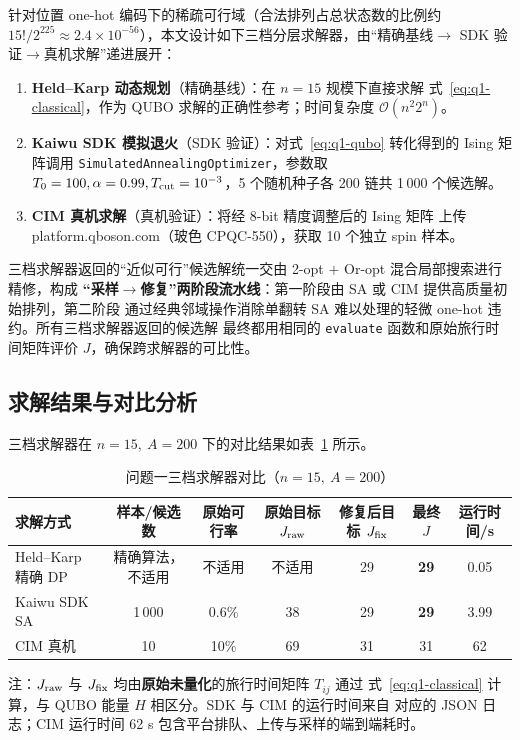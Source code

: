 \documentclass[UTF8,12pt,a4paper]{ctexart}
\begin{document}
针对位置 one-hot 编码下的稀疏可行域（合法排列占总状态数的比例约
$15!/2^{225}\!\approx\!2.4\times 10^{-56}$），本文设计如下三档分层求解器，由``精确基线$\to$
SDK 验证$\to$真机求解''递进展开：
\begin{enumerate}
  \item[(i)] \textbf{Held--Karp 动态规划}\cite{heldkarp1962dp}（精确基线）：在 $n=15$ 规模下直接求解
    式~\eqref{eq:q1-classical}，作为 QUBO 求解的正确性参考；时间复杂度 $\mathcal{O}(n^{2}2^{n})$。
  \item[(ii)] \textbf{Kaiwu SDK 模拟退火}\cite{kirkpatrick1983sa,kaiwusdk2024}（SDK 验证）：对式~\eqref{eq:q1-qubo} 转化得到的
    Ising 矩阵调用 \texttt{SimulatedAnnealingOptimizer}，参数取 $T_{0}=100,\alpha=0.99,
    T_{\rm cut}=10^{-3}$，5 个随机种子各 200 链共 1\,000 个候选解。
  \item[(iii)] \textbf{CIM 真机求解}（真机验证）：将经 8-bit 精度调整后的 Ising 矩阵
    上传 platform.qboson.com（玻色 CPQC-550），获取 10 个独立 spin 样本。
\end{enumerate}
三档求解器返回的``近似可行''候选解统一交由 2-opt\cite{lin1973twoopt} $+$ Or-opt\cite{or1976oropt} 混合局部搜索进行精修，构成
\textbf{``采样$\to$修复''两阶段流水线}：第一阶段由 SA 或 CIM 提供高质量初始排列，第二阶段
通过经典邻域操作消除单翻转 SA 难以处理的轻微 one-hot 违约。所有三档求解器返回的候选解
最终都用相同的 \texttt{evaluate} 函数和原始旅行时间矩阵评价 $J$，确保跨求解器的可比性。

\subsection{求解结果与对比分析}
\label{subsec:q1-result}

三档求解器在 $n=15,\ A=200$ 下的对比结果如表~\ref{tab:q1-cmp} 所示。

\begin{table}[H]
  \centering
  \caption{问题一三档求解器对比（$n=15,\ A=200$）}
  \label{tab:q1-cmp}
  \footnotesize
  \begin{tabular}{lcccccc}
    \toprule
    求解方式 & 样本/候选数 & 原始可行率 & 原始目标 $J_{\rm raw}$ & 修复后目标 $J_{\rm fix}$ & 最终 $J$ & 运行时间/s \\
    \midrule
    Held--Karp 精确 DP & 精确算法，不适用 & 不适用 & 不适用 & 29 & \textbf{29} & 0.05 \\
    Kaiwu SDK SA      & 1\,000 & 0.6\% & 38 & 29 & \textbf{29} & 3.99 \\
    CIM 真机          & 10    & 10\%  & 69 & 31 & 31         & 62 \\
    \bottomrule
  \end{tabular}
  \begin{flushleft}\footnotesize
  注：$J_{\rm raw}$ 与 $J_{\rm fix}$ 均由\textbf{原始未量化}的旅行时间矩阵 $T_{ij}$ 通过
  式~\eqref{eq:q1-classical} 计算，与 QUBO 能量 $H$ 相区分。SDK 与 CIM 的运行时间来自
  对应的 JSON 日志；CIM 运行时间 62 s 包含平台排队、上传与采样的端到端耗时。
  \end{flushleft}
\end{table}
\end{document}
